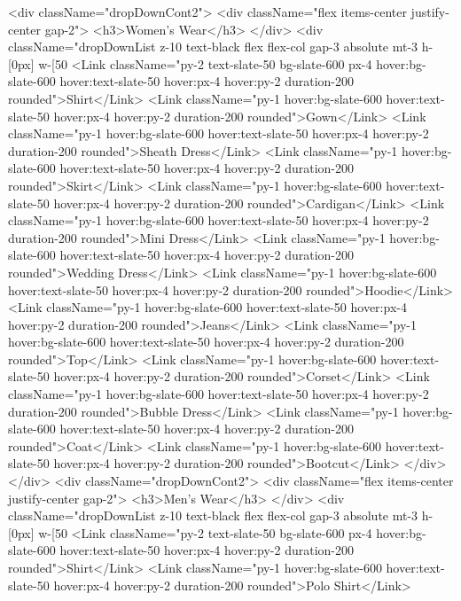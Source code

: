 <div className="dropDownCont2">
    <div className="flex items-center justify-center gap-2">
        <h3>Women's Wear</h3>
    </div>
    <div className="dropDownList z-10 text-black flex flex-col gap-3 absolute mt-3 h-[0px] w-[50%
        <Link className="py-2 text-slate-50 bg-slate-600 px-4 hover:bg-slate-600 hover:text-slate-50 hover:px-4 hover:py-2 duration-200 rounded">Shirt</Link>
        <Link className="py-1 hover:bg-slate-600 hover:text-slate-50 hover:px-4 hover:py-2 duration-200 rounded">Gown</Link>
        <Link className="py-1 hover:bg-slate-600 hover:text-slate-50 hover:px-4 hover:py-2 duration-200 rounded">Sheath Dress</Link>
        <Link className="py-1 hover:bg-slate-600 hover:text-slate-50 hover:px-4 hover:py-2 duration-200 rounded">Skirt</Link>
        <Link className="py-1 hover:bg-slate-600 hover:text-slate-50 hover:px-4 hover:py-2 duration-200 rounded">Cardigan</Link>
        <Link className="py-1 hover:bg-slate-600 hover:text-slate-50 hover:px-4 hover:py-2 duration-200 rounded">Mini Dress</Link>
        <Link className="py-1 hover:bg-slate-600 hover:text-slate-50 hover:px-4 hover:py-2 duration-200 rounded">Wedding Dress</Link>
        <Link className="py-1 hover:bg-slate-600 hover:text-slate-50 hover:px-4 hover:py-2 duration-200 rounded">Hoodie</Link>
        <Link className="py-1 hover:bg-slate-600 hover:text-slate-50 hover:px-4 hover:py-2 duration-200 rounded">Jeans</Link>
        <Link className="py-1 hover:bg-slate-600 hover:text-slate-50 hover:px-4 hover:py-2 duration-200 rounded">Top</Link>
        <Link className="py-1 hover:bg-slate-600 hover:text-slate-50 hover:px-4 hover:py-2 duration-200 rounded">Corset</Link>
        <Link className="py-1 hover:bg-slate-600 hover:text-slate-50 hover:px-4 hover:py-2 duration-200 rounded">Bubble Dress</Link>
        <Link className="py-1 hover:bg-slate-600 hover:text-slate-50 hover:px-4 hover:py-2 duration-200 rounded">Coat</Link>
        <Link className="py-1 hover:bg-slate-600 hover:text-slate-50 hover:px-4 hover:py-2 duration-200 rounded">Bootcut</Link>
    </div>
</div>
<div className="dropDownCont2">
    <div className="flex items-center justify-center gap-2">
        <h3>Men's Wear</h3>
    </div>
    <div className="dropDownList z-10 text-black flex flex-col gap-3 absolute mt-3 h-[0px] w-[50%
        <Link className="py-2 text-slate-50 bg-slate-600 px-4 hover:bg-slate-600 hover:text-slate-50 hover:px-4 hover:py-2 duration-200 rounded">Shirt</Link>
        <Link className="py-1 hover:bg-slate-600 hover:text-slate-50 hover:px-4 hover:py-2 duration-200 rounded">Polo Shirt</Link>
